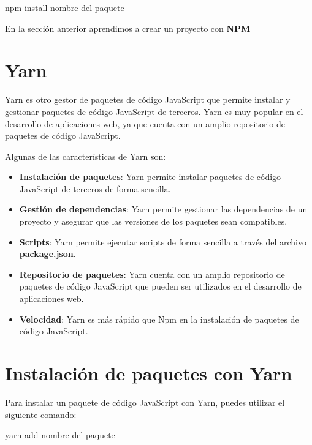 \documentclass[
  a4paper,
  DIV=11,
  numbers=noendperiod,
  onepage,
  openany]{scrreprt}
\newenvironment{Shaded}{\begin{snugshade}}{\end{snugshade}}
\newcommand{\ExtensionTok}[1]{\textcolor[rgb]{0.00,0.23,0.31}{#1}}
\newcommand{\NormalTok}[1]{\textcolor[rgb]{0.00,0.23,0.31}{#1}}
\begin{document}
\begin{tcolorbox}
\begin{Shaded}
\begin{Highlighting}[]
\ExtensionTok{npm}\NormalTok{ install nombre{-}del{-}paquete}
\end{Highlighting}
\end{Shaded}

En la sección anterior aprendimos a crear un proyecto con \textbf{NPM}

\section{Yarn}\label{yarn}

Yarn es otro gestor de paquetes de código JavaScript que permite
instalar y gestionar paquetes de código JavaScript de terceros. Yarn es
muy popular en el desarrollo de aplicaciones web, ya que cuenta con un
amplio repositorio de paquetes de código JavaScript.

Algunas de las características de Yarn son:

\begin{itemize}
\item
  \textbf{Instalación de paquetes}: Yarn permite instalar paquetes de
  código JavaScript de terceros de forma sencilla.
\item
  \textbf{Gestión de dependencias}: Yarn permite gestionar las
  dependencias de un proyecto y asegurar que las versiones de los
  paquetes sean compatibles.
\item
  \textbf{Scripts}: Yarn permite ejecutar scripts de forma sencilla a
  través del archivo \textbf{package.json}.
\item
  \textbf{Repositorio de paquetes}: Yarn cuenta con un amplio
  repositorio de paquetes de código JavaScript que pueden ser utilizados
  en el desarrollo de aplicaciones web.
\item
  \textbf{Velocidad}: Yarn es más rápido que Npm en la instalación de
  paquetes de código JavaScript.
\end{itemize}

\section{Instalación de paquetes con
Yarn}\label{instalaciuxf3n-de-paquetes-con-yarn}

Para instalar un paquete de código JavaScript con Yarn, puedes utilizar
el siguiente comando:

\begin{Shaded}
\begin{Highlighting}[]
\ExtensionTok{yarn}\NormalTok{ add nombre{-}del{-}paquete}
\end{Highlighting}
\end{Shaded}


\end{tcolorbox}
\end{document}

